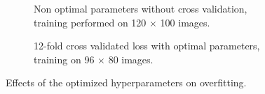 \begin{figure}[H]
    \centering
    \begin{subfigure}{0.49\textwidth}
        \centering
        \caption{Non optimal parameters without cross validation, training performed on 120 $\times$ 100 images.}
    \end{subfigure}
    \hfill
    \begin{subfigure}{0.49\textwidth}
        \centering
        \caption{12-fold cross validated loss with optimal parameters, training on 96 $\times$ 80 images.}
        \label{fig:comp4b}
    \end{subfigure}
    \caption{Effects of the optimized hyperparameters on overfitting.}
    \label{fig:comp4}
\end{figure}
